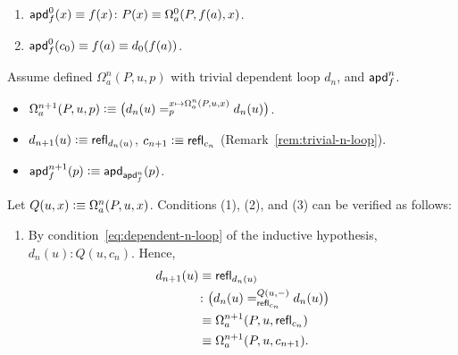 \begin{defn}
\begin{description}[font=\normalfont\scshape]
\begin{enumerate}[(1)]
            \item $\fun{apd}^0_f(x)\equiv f(x)\colon P(x)\equiv\Omega^0_a(P,f(a),x)$.
    
            \item $\mathsf{apd}^0_f(c_0)\equiv f(a)\equiv d_0(f(a))$.
        \end{enumerate}

        \item[Inductive Step ($n \mapsto n+1$):]
        Assume defined $\Omega^n_a(P,u,p)$ with trivial dependent loop $d_n$, and $\mathsf{apd}^n_f$.
        
        \begin{itemize}
            \item $\Omega^{n+1}_a(P,u,p)\mathrel{\vcentcolon}\equiv\bigl(d_n(u)=_{p}^{x\mapsto\Omega^n_a(P,u,x)}d_n(u)\bigr)$.
            
            \item $d_{n+1}(u)\mathrel{\vcentcolon}\equiv\mathsf{refl}_{d_n(u)}$, $c_{n+1}\mathrel{\vcentcolon}\equiv\mathsf{refl}_{c_n}$ (Remark~\ref{rem:trivial-n-loop}).
            
            \item $\mathsf{apd}^{n+1}_f(p)\mathrel{\vcentcolon}\equiv \mathsf{apd}_{\mathsf{apd}^n_f}(p)$.
        \end{itemize}
        Let $Q(u,x)\mathrel{\vcentcolon}\equiv\Omega^n_a(P,u,x)$. Conditions (1), (2), and (3) can be verified as follows:
        \begin{enumerate}[(1)]
            \item By condition~\eqref{eq:dependent-n-loop} of the inductive hypothesis, $d_n(u)\colon Q(u,c_n)$. Hence,
            \begin{align*}
                d_{n+1}(u)&\equiv\fun{refl}_{d_n(u)}\\
                &\colon\bigl(
                    d_n(u)
                    \eqt{\fun{refl}_{c_n}}
                        {Q(u,\dummy)}
                    d_n(u)
                \bigr)\\
                &\equiv\Omega^{n+1}_a
                    (P,u,\fun{refl}_{c_n})\\
                &\equiv\Omega^{n+1}_a(P,u,c_{n+1}).
            \end{align*}
            

\end{enumerate}
\end{description}
\end{defn}
